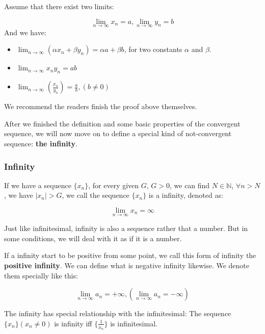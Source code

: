 \documentclass[oneside]{book}
\begin{document}
\begin{theorem}

Assume that there exist two limits:

\[\lim_{n \to \infty} x_n = a, \lim_{n \to \infty} y_n = b\]
And we have:
\begin{itemize}
    \item $\lim_{n \to \infty} (\alpha x_n + \beta y_n) = \alpha a + \beta b$, for two constants $\alpha$ and $\beta$.
    \item $\lim_{n \to \infty} x_ny_n = ab$
    \item $\lim_{n \to \infty} (\frac{x_n}{y_n}) = \frac{a}{b},(b\neq0)$
\end{itemize}
\end{theorem}
We recommend the readers finish the proof above themselves.

After we finished the definition and some basic properties of the convergent sequence, we will now move on to define a special kind of not-convergent sequence: \textbf{the infinity}.

\subsubsection{Infinity}

\begin{definition}[Infinity]
If we have a sequence $\{x_n\}$, for every given $G$, $G>0$, we can find $N \in \mathbb{N}$, $\forall n > N$, we have $|x_n|>G$, we call the sequence $\{x_n\}$ is a infinity, denoted as:

\[\lim_{n \to \infty} x_n = \infty\]

\end{definition}

Just like infinitesimal, infinity is also a sequence rather that a number. But in some conditions, we will deal with it as if it is a number.

If a infinity start to be positive from some point, we call this form of infinity the \textbf{positive infinity}. We can define what is negative infinity likewise. We denote them specially like this:

\[
\lim_{n \to \infty} a_n = + \infty,(\lim_{n \to \infty} a_n = - \infty)
\]

\begin{theorem}
The infinity has special relationship with the infinitesimal:
The sequence $\{x_n\}(x_n \neq 0)$ is infinity iff $\{\frac{1}{x_n}\}$ is infinitesimal. 
\end{theorem}
\end{document}
